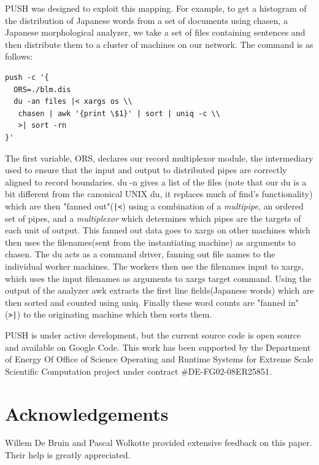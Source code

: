 \documentclass{sig-alt-release2}
\begin{document}
PUSH was designed to exploit this mapping. For example, to get a histogram of 
the distribution of Japanese words from a set of documents using chasen, 
a Japanese morphological analyzer, we take a set of files containing sentences 
and then distribute them to a cluster of machines on our network. The command 
is as follows:

\begin{verbatim}
push -c '{
  ORS=./blm.dis
  du -an files |< xargs os \\
   chasen | awk '{print \$1}' | sort | uniq -c \\
   >| sort -rn
}'
\end{verbatim}

The first variable, ORS, declares our record multiplexor module, the intermediary 
used to ensure that the input and output to distributed pipes are correctly 
aligned to record boundaries. du -n gives a list of the files (note that our 
du is a bit different from the canonical UNIX du, it replaces much of find's 
functionality) which are then "fanned out"(\verb!|<!) using a combination 
of a \emph{multipipe}, an ordered set of pipes, and a \emph{multiplexor} 
which determines which pipes are the targets of each unit of output.  
This fanned out data goes to xargs on other machines which 
then uses the filenames(sent from the instantiating machine) as arguments to 
chasen. The du acts as a command driver, fanning out file names to the 
individual worker machines. The workers then use the filenames input to 
xargs, which uses the input filenames as arguments to xargs target command. 
Using the output of the analyzer awk extracts the first line fields(Japanese 
words) which are then sorted and counted using uniq.  Finally these word 
counts are "fanned in"(\verb!>|!) to the originating machine which then 
sorts them. 

PUSH is under active development, but the current source code is open source 
and available on Google Code.
This work has been supported by the Department of Energy Of Office of Science Operating and Runtime Systems for Extreme Scale Scientific Computation project under contract \#DE-FG02-08ER25851. 

\section{Acknowledgements}

Willem De Bruin and Pascal Wolkotte provided extensive feedback on this paper. Their help is greatly appreciated.





\end{document}
